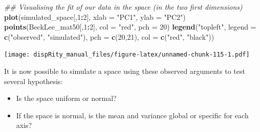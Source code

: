 \documentclass[]{book}
\newenvironment{Shaded}{\begin{snugshade}}{\end{snugshade}}
\newcommand{\CommentTok}[1]{\textcolor[rgb]{0.56,0.35,0.01}{\textit{#1}}}
\newcommand{\DataTypeTok}[1]{\textcolor[rgb]{0.13,0.29,0.53}{#1}}
\newcommand{\DecValTok}[1]{\textcolor[rgb]{0.00,0.00,0.81}{#1}}
\newcommand{\KeywordTok}[1]{\textcolor[rgb]{0.13,0.29,0.53}{\textbf{#1}}}
\newcommand{\NormalTok}[1]{#1}
\newcommand{\OperatorTok}[1]{\textcolor[rgb]{0.81,0.36,0.00}{\textbf{#1}}}
\newcommand{\StringTok}[1]{\textcolor[rgb]{0.31,0.60,0.02}{#1}}
\providecommand{\tightlist}{%
  \setlength{\itemsep}{0pt}\setlength{\parskip}{0pt}}
\begin{document}
\begin{Shaded}
\begin{Highlighting}[]
\CommentTok{## Visualising the fit of our data in the space (in the two first dimensions)}
\KeywordTok{plot}\NormalTok{(simulated_space[,}\DecValTok{1}\OperatorTok{:}\DecValTok{2}\NormalTok{], }\DataTypeTok{xlab =} \StringTok{"PC1"}\NormalTok{, }\DataTypeTok{ylab =} \StringTok{"PC2"}\NormalTok{)}
\KeywordTok{points}\NormalTok{(BeckLee_mat50[,}\DecValTok{1}\OperatorTok{:}\DecValTok{2}\NormalTok{], }\DataTypeTok{col =} \StringTok{"red"}\NormalTok{, }\DataTypeTok{pch =} \DecValTok{20}\NormalTok{)}
\KeywordTok{legend}\NormalTok{(}\StringTok{"topleft"}\NormalTok{, }\DataTypeTok{legend =} \KeywordTok{c}\NormalTok{(}\StringTok{"observed"}\NormalTok{, }\StringTok{"simulated"}\NormalTok{),}
        \DataTypeTok{pch =} \KeywordTok{c}\NormalTok{(}\DecValTok{20}\NormalTok{,}\DecValTok{21}\NormalTok{), }\DataTypeTok{col =} \KeywordTok{c}\NormalTok{(}\StringTok{"red"}\NormalTok{, }\StringTok{"black"}\NormalTok{))}
\end{Highlighting}
\end{Shaded}

\texttt{[image: dispRity\_manual\_files/figure-latex/unnamed-chunk-115-1.pdf]}

It is now possible to simulate a space using these observed arguments to test several hypothesis:

\begin{itemize}
\tightlist
\item
  Is the space uniform or normal?
\item
  If the space is normal, is the mean and variance global or specific for each axis?
\end{itemize}
\end{document}
